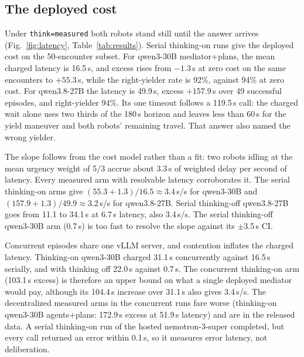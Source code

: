 \documentclass[journal]{IEEEtran}
\begin{document}
\subsection{The deployed cost}
\label{sec:latency}
Under \texttt{think=measured} both robots stand still until the answer arrives (Fig.~\ref{fig:latency}, Table~\ref{tab:results}). Serial thinking-on runs give the deployed cost on the 50-encounter subset. For qwen3-30B mediator+plans, the mean charged latency is 16.5\,s, and excess rises from $-1.3$\,s at zero cost on the same encounters to $+55.3$\,s, while the right-yielder rate is 92\%, against 94\% at zero cost. For qwen3.8-27B the latency is 49.9\,s, excess $+157.9$\,s over 49 successful episodes, and right-yielder 94\%. Its one timeout follows a 119.5\,s call: the charged wait alone uses two thirds of the 180\,s horizon and leaves less than 60\,s for the yield maneuver and both robots' remaining travel. That answer also named the wrong yielder.

The slope follows from the cost model rather than a fit: two robots idling at the mean urgency weight of 5/3 accrue about 3.3\,s of weighted delay per second of latency. Every measured arm with resolvable latency corroborates it. The serial thinking-on arms give $(55.3+1.3)/16.5\approx3.4$\,s/s for qwen3-30B and $(157.9+1.3)/49.9\approx3.2$\,s/s for qwen3.8-27B. Serial thinking-off qwen3.8-27B goes from 11.1 to 34.1\,s at 6.7\,s latency, also 3.4\,s/s. The serial thinking-off qwen3-30B arm (0.7\,s) is too fast to resolve the slope against its $\pm$3.5\,s CI.

Concurrent episodes share one vLLM server, and contention inflates the charged latency. Thinking-on qwen3-30B charged 31.1\,s concurrently against 16.5\,s serially, and with thinking off 22.0\,s against 0.7\,s. The concurrent thinking-on arm (103.1\,s excess) is therefore an upper bound on what a single deployed mediator would pay, although its 104.4\,s increase over 31.1\,s also gives 3.4\,s/s. The decentralized measured arms in the concurrent runs fare worse (thinking-on qwen3-30B agents+plans: 172.9\,s excess at 51.9\,s latency) and are in the released data. A serial thinking-on run of the hosted nemotron-3-super completed, but every call returned an error within 0.1\,s, so it measures error latency, not deliberation.
\end{document}
